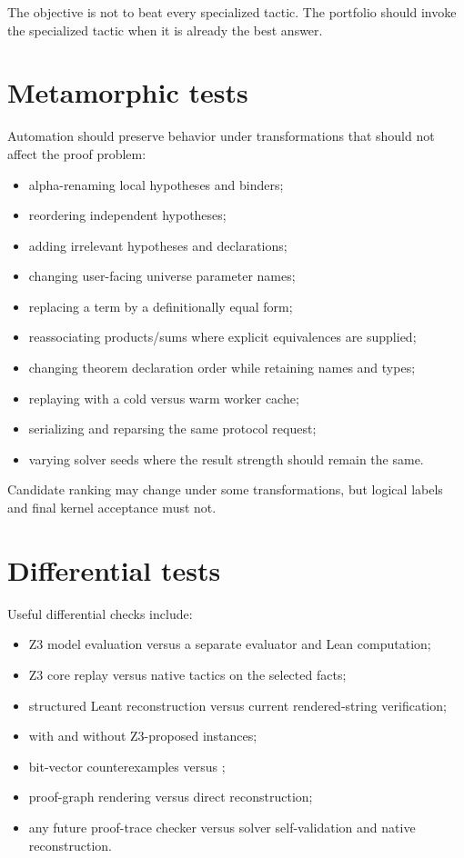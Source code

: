 \documentclass[11pt,letterpaper,openany]{report}
\newcommand{\code}[1]{\texttt{\detokenize{#1}}}
\begin{document}
The objective is not to beat every specialized tactic. The portfolio should invoke the
specialized tactic when it is already the best answer.

\section{Metamorphic tests}

Automation should preserve behavior under transformations that should not affect the
proof problem:

\begin{itemize}
  \item alpha-renaming local hypotheses and binders;
  \item reordering independent hypotheses;
  \item adding irrelevant hypotheses and declarations;
  \item changing user-facing universe parameter names;
  \item replacing a term by a definitionally equal form;
  \item reassociating products/sums where explicit equivalences are supplied;
  \item changing theorem declaration order while retaining names and types;
  \item replaying with a cold versus warm worker cache;
  \item serializing and reparsing the same protocol request;
  \item varying solver seeds where the result strength should remain the same.
\end{itemize}

Candidate ranking may change under some transformations, but logical labels and final
kernel acceptance must not.

\section{Differential tests}

Useful differential checks include:

\begin{itemize}
  \item Z3 model evaluation versus a separate evaluator and Lean computation;
  \item Z3 core replay versus native tactics on the selected facts;
  \item structured Leant reconstruction versus current rendered-string verification;
  \item \code{grind} with and without Z3-proposed instances;
  \item bit-vector counterexamples versus \code{bv_decide};
  \item proof-graph rendering versus direct \code{Expr} reconstruction;
  \item any future proof-trace checker versus solver self-validation and native
        reconstruction.
\end{itemize}
\end{document}
